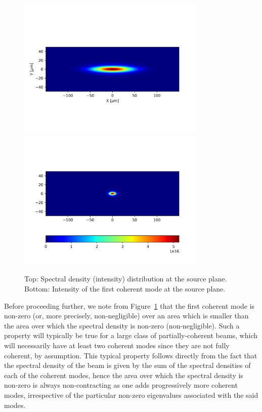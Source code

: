 \documentclass{iucr}              %
\begin{document}
\begin{figure}\label{spectral_density}
\caption{Top: Spectral density (intensity) distribution at the source plane. Bottom: Intensity of the first coherent mode at the source plane.}
\includegraphics[width=9.0cm]{Figures/spectral_density_upto1099.png}
\includegraphics[width=9.0cm]{Figures/spectral_density_upto0.png}
\end{figure}

Before proceeding further, we note from Figure~\ref{spectral_density} that the first coherent mode is non-zero (or, more precisely, non-negligible) over an area which is smaller than the area over which the spectral density is non-zero (non-negligible). Such a property will typically be true for a large class of partially-coherent beams, which will necessarily have at least two coherent modes since they are not fully coherent, by assumption.  This typical property follows directly from the fact that the spectral density of the beam is given by the sum of the spectral densities of each of the coherent modes, hence the area over which the spectral density is non-zero is always non-contracting as one adds progressively more coherent modes, irrespective of the particular non-zero eigenvalues associated with the said modes.  
\end{document}
